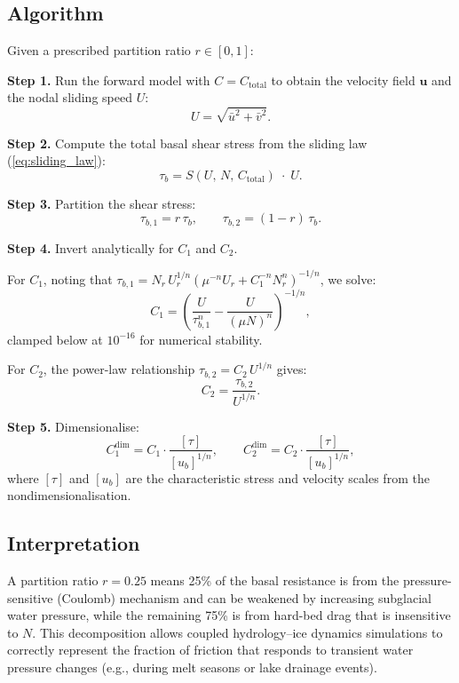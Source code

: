 \documentclass[a4paper,11pt,fleqn]{article}
\newcommand{\ve}[1]{\boldsymbol{#1}}
\newcommand{\be}{\begin{equation}}
\newcommand{\ee}{\end{equation}}
\begin{document}
\subsection{Algorithm}

Given a prescribed partition ratio $r \in [0,1]$:

\medskip\noindent\textbf{Step 1.} Run the forward model with $C = C_{\mathrm{total}}$ to obtain the velocity field $\ve{u}$ and the nodal sliding speed $U$:
\be
U = \sqrt{\bar u^2 + \bar v^2}.
\ee

\noindent\textbf{Step 2.} Compute the total basal shear stress from the sliding law (\ref{eq:sliding_law}):
\be
\tau_b = S(U,\, N,\, C_{\mathrm{total}})\;\cdot\; U.
\ee

\noindent\textbf{Step 3.} Partition the shear stress:
\be
\tau_{b,1} = r\,\tau_b, \qquad \tau_{b,2} = (1-r)\,\tau_b.
\ee

\noindent\textbf{Step 4.} Invert analytically for $C_1$ and $C_2$.

For $C_1$, noting that $\tau_{b,1} = N_r\,U_r^{1/n}\left(\mu^{-n}U_r + C_1^{-n}N_r^n\right)^{-1/n}$, we solve:
\be
\label{eq:C1_solve}
C_1 = \left(\frac{U}{\tau_{b,1}^n} - \frac{U}{(\mu N)^n}\right)^{-1/n},
\ee
clamped below at $10^{-16}$ for numerical stability.

For $C_2$, the power-law relationship $\tau_{b,2} = C_2\, U^{1/n}$ gives:
\be
\label{eq:C2_solve}
C_2 = \frac{\tau_{b,2}}{U^{1/n}}.
\ee

\noindent\textbf{Step 5.} Dimensionalise:
\be
C_{1}^{\mathrm{dim}} = C_1 \cdot \frac{[\tau]}{[u_b]^{1/n}}, \qquad
C_{2}^{\mathrm{dim}} = C_2 \cdot \frac{[\tau]}{[u_b]^{1/n}},
\ee
where $[\tau]$ and $[u_b]$ are the characteristic stress and velocity scales from the nondimensionalisation.

\subsection{Interpretation}

A partition ratio $r = 0.25$ means 25\% of the basal resistance is from the pressure-sensitive (Coulomb) mechanism and can be weakened by increasing subglacial water pressure, while the remaining 75\% is from hard-bed drag that is insensitive to $N$. This decomposition allows coupled hydrology--ice dynamics simulations to correctly represent the fraction of friction that responds to transient water pressure changes (e.g., during melt seasons or lake drainage events).

\end{document}
